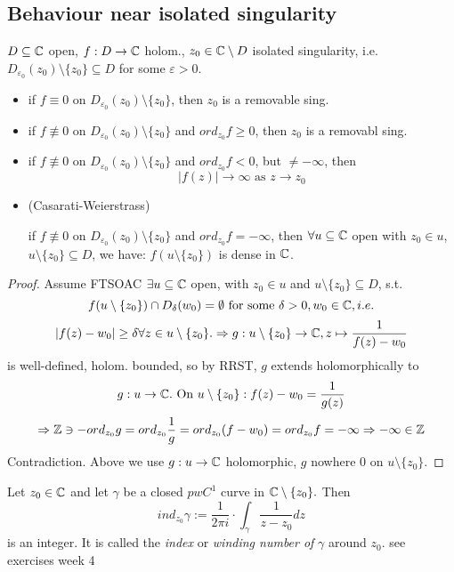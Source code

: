 \subsection*{Behaviour near isolated singularity}
$D\subseteq \mathbb{C}$ open, $f: D\to \mathbb{C}$ holom., $z_0\in \mathbb{C}\setminus D$ isolated singularity, i.e. $D_{\varepsilon_0}(z_0)\setminus \{z_0\}\subseteq D$ for some $\varepsilon >0$.
  \begin{itemize}
    \item if $f \equiv 0$ on $D_{\varepsilon_0}(z_0)\setminus \{z_0\}$, then $z_0$ is a removable sing.
    \item if $f \not \equiv 0$ on $D_{\varepsilon_0}(z_0)\setminus \{z_0\}$ and $ord_{z_0}f\geq0$, then $z_0$ is a removabl sing.
    \item if $f\not \equiv 0$ on $D_{\varepsilon_0}(z_0)\setminus \{z_0\}$ and $ord_{z_0}f<0$, but $\neq -\infty$, then
      $$|f(z)| \to \infty \text{ as }z \to z_0$$
      \item (Casarati-Weierstrass)

       if $f \not\equiv 0$ on $D_{\varepsilon_0}(z_0)\setminus \{z_0\}$ and $ord_{z_0}f=-\infty$, then $\forall u\subseteq \mathbb{C}$ open with $z_0\in u$, $u\setminus\{z_0\} \subseteq D$, we have: $f(u\setminus\{z_0\})$ is dense in $\mathbb{C}$.
  \end{itemize}
\begin{proof}
  Assume FTSOAC $\exists u\subseteq \mathbb{C}$ open, with $z_0\in u$ and $u\setminus\{z_0\}\subseteq D$, s.t.
    $$f(u\setminus\{z_0\})\cap D_\delta(w_0)=\emptyset \text{ for some }\delta>0, w_0\in \mathbb{C}, i.e.$$
    $$|f(z)-w_0|\geq \delta \forall z\in u\setminus\{z_0\}. \Rightarrow g:u\setminus\{z_0\}\to \mathbb{C}, z\mapsto \frac{1}{f(z)-w_0}$$
    is well-defined, holom. bounded, so by RRST, $g$ extends holomorphically to
      $$g: u\to \mathbb{C}. \text{ On }u\setminus\{z_0\}: f(z)-w_0=\frac{1}{g(z)}$$
      $$\Rightarrow \mathbb{Z} \ni -ord_{z_0}g=ord_{z_0}\frac{1}{g}=ord_{z_0}(f-w_0)=ord_{z_0}f=-\infty \Rightarrow -\infty\in \mathbb{Z}$$
      Contradiction.
      Above we use $g:u\to \mathbb{C}$ holomorphic, $g$ nowhere $0$ on $u\setminus\{z_0\}$.
      \qedhere
\end{proof}
\begin{definition}
  Let $z_0\in\mathbb{C}$ and let $\gamma$ be a closed $pwC^1$ curve in $\mathbb{C}\setminus\{z_0\}.$ Then
    $$ind_{z_0}\gamma := \frac{1}{2 \pi i} \cdot \int_{\gamma}\frac{1}{z-z_0}dz$$
  is an integer. It is called the \emph{index} or \emph{winding number of }$\gamma$ around $z_0$.
  \newline see exercises week 4
\end{definition}
